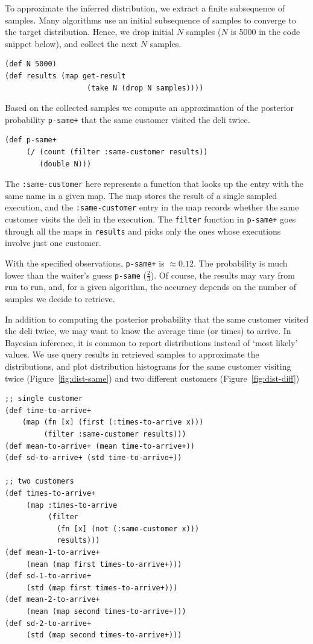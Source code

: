 \documentclass[preprint]{sigplanconf}
\begin{document}
To approximate the inferred distribution, we extract a finite
subsequence of samples. Many algorithms use an initial
subsequence of samples to converge to the target distribution.
Hence, we drop initial $N$ samples ($N$ is 5000 in the code
snippet below), and collect the next $N$ samples.

\begin{lstlisting}[style=default]
(def N 5000)
(def results (map get-result
                   (take N (drop N samples))))
\end{lstlisting}

Based on the collected samples we compute an approximation of
the posterior probability \texttt{p-same+} that the same
customer visited the deli twice.

\begin{lstlisting}[style=default]
(def p-same+ 
     (/ (count (filter :same-customer results))
        (double N)))
\end{lstlisting}
The \texttt{:same-customer} here represents a function
that looks up the entry with the same name in a given map.
The map stores the result of a single sampled execution,
and the \texttt{:same-customer} entry in the map
records whether the same customer visits the deli in the execution.
The \texttt{filter} function in \texttt{p-same+} 
goes through all the maps in \texttt{results}
and picks only the ones whose executions involve just one customer.

With the specified observations, \texttt{p-same+} is $\approx
0.12$. The probability is much lower than the
waiter's guess \texttt{p-same} ($\frac 2 3$).
Of course, the results may vary from run to run, and, for a given
algorithm, the accuracy depends on the number of samples we
decide to retrieve. 

In addition to computing the posterior probability that the same
customer visited the deli twice, we may want to know the average
time (or times) to arrive. In Bayesian inference, it is common
to report distributions instead of `most likely' values. We use
query results in retrieved samples to approximate the
distributions, and plot distribution histograms for the same
customer visiting twice (Figure~\ref{fig:dist-same}) and
two different customers (Figure~\ref{fig:dist-diff})

\begin{lstlisting}[style=default]
;; single customer                      
(def time-to-arrive+ 
    (map (fn [x] (first (:times-to-arrive x)))
         (filter :same-customer results)))
(def mean-to-arrive+ (mean time-to-arrive+))
(def sd-to-arrive+ (std time-to-arrive+))

;; two customers
(def times-to-arrive+ 
     (map :times-to-arrive 
          (filter  
            (fn [x] (not (:same-customer x)))
            results)))
(def mean-1-to-arrive+
     (mean (map first times-to-arrive+)))
(def sd-1-to-arrive+
     (std (map first times-to-arrive+)))
(def mean-2-to-arrive+
     (mean (map second times-to-arrive+)))
(def sd-2-to-arrive+
     (std (map second times-to-arrive+)))
\end{lstlisting}
\end{document}
